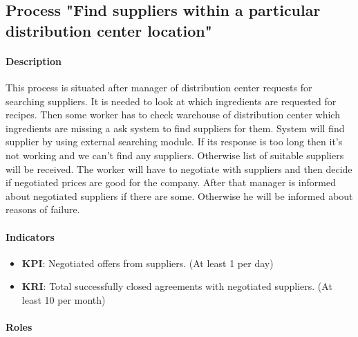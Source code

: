 \documentclass[11pt,a4paper]{article}
\begin{document}



\subsection{Process "Find suppliers within a particular distribution center location"}

\paragraph{Description}

This process is situated after manager of distribution center requests for searching suppliers. It is needed to look at which ingredients are requested for recipes. Then some worker has to check warehouse of distribution center which ingredients are missing a ask system to find suppliers for them. System will find supplier by using external searching module. If its response is too long then it's not working and we can't find any suppliers. Otherwise list of suitable suppliers will be received. The worker will have to negotiate with suppliers and then decide if negotiated prices are good for the company. After that manager is informed about negotiated suppliers if there are some. Otherwise he will be informed about reasons of failure.

\paragraph{Indicators}

\begin{itemize}
    \item \textbf{KPI}: Negotiated offers from suppliers. (At least 1 per day)
    \item \textbf{KRI}: Total successfully closed agreements with negotiated suppliers. (At least 10 per month)
\end{itemize}

\paragraph{Roles}
\end{document}
